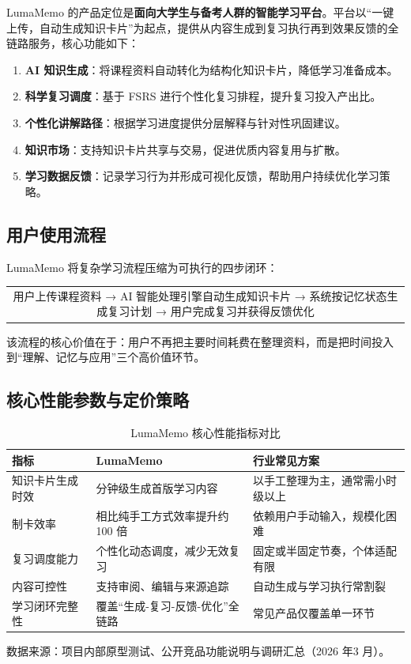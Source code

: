 LumaMemo 的产品定位是\textbf{面向大学生与备考人群的智能学习平台}。平台以“一键上传，自动生成知识卡片”为起点，提供从内容生成到复习执行再到效果反馈的全链路服务，核心功能如下：

\begin{enumerate}[leftmargin=2em]
	\item \textbf{AI 知识生成}：将课程资料自动转化为结构化知识卡片，降低学习准备成本。
	\item \textbf{科学复习调度}：基于 FSRS 进行个性化复习排程，提升复习投入产出比。
	\item \textbf{个性化讲解路径}：根据学习进度提供分层解释与针对性巩固建议。
	\item \textbf{知识市场}：支持知识卡片共享与交易，促进优质内容复用与扩散。
	\item \textbf{学习数据反馈}：记录学习行为并形成可视化反馈，帮助用户持续优化学习策略。
\end{enumerate}

\subsection{用户使用流程}

LumaMemo 将复杂学习流程压缩为可执行的四步闭环：

\begin{center}
\small
\begin{tabular}{c}
用户上传课程资料 → AI 智能处理引擎自动生成知识卡片 → 系统按记忆状态生成复习计划 → 用户完成复习并获得反馈优化
\end{tabular}
\end{center}

该流程的核心价值在于：用户不再把主要时间耗费在整理资料，而是把时间投入到“理解、记忆与应用”三个高价值环节。

\subsection{核心性能参数与定价策略}

\begin{table}[htbp]
	\centering
	\caption{LumaMemo 核心性能指标对比}
	\label{tab:chap3_performance}
	\begin{tabular}{p{3.8cm}p{4.1cm}p{4.8cm}}
		\toprule
		\textbf{指标} & \textbf{LumaMemo} & \textbf{行业常见方案} \\
		\midrule
		知识卡片生成时效 & 分钟级生成首版学习内容 & 以手工整理为主，通常需小时级以上 \\
		制卡效率 & 相比纯手工方式效率提升约100 倍 & 依赖用户手动输入，规模化困难 \\
		复习调度能力 & 个性化动态调度，减少无效复习 & 固定或半固定节奏，个体适配有限 \\
		内容可控性 & 支持审阅、编辑与来源追踪 & 自动生成与学习执行常割裂 \\
		学习闭环完整性 & 覆盖“生成-复习-反馈-优化”全链路 & 常见产品仅覆盖单一环节 \\
		\bottomrule
	\end{tabular}
	\begin{flushleft}
		\footnotesize 数据来源：项目内部原型测试、公开竞品功能说明与调研汇总（2026 年3 月）。
	\end{flushleft}
\end{table}

